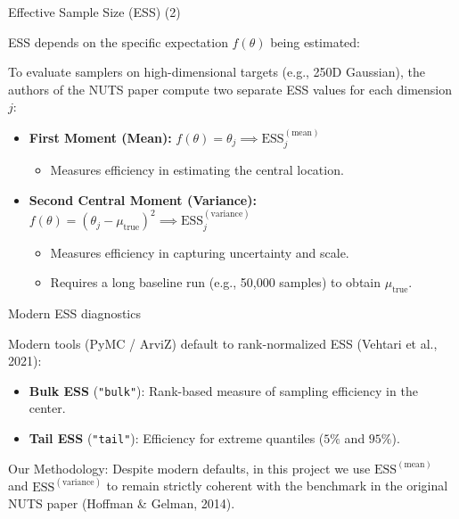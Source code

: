 \documentclass[aspectratio=43]{beamer}
\begin{document}
\begin{frame}{Effective Sample Size (ESS) (2)}
	
	ESS depends on the specific expectation \alert{$f(\theta)$} being estimated:
	
	\vspace{0.3em}
	
	To evaluate samplers on high-dimensional targets (e.g., 250D Gaussian), the authors of the NUTS paper compute two separate ESS values for each dimension $j$:
	
	\vspace{0.3em}
	
	\begin{itemize}
		\item \textbf{First Moment (Mean):} $f(\theta) = \theta_j \implies \text{ESS}_j^{(\text{mean})}$
		\begin{itemize}
			\item Measures efficiency in estimating the central location.
		\end{itemize}
		\vspace{0.2em}
		\item \textbf{Second Central Moment (Variance):} $f(\theta) = (\theta_j - \mu_{\text{true}})^2 \implies \text{ESS}_j^{(\text{variance})}$
		\begin{itemize}
			\item Measures efficiency in capturing uncertainty and scale.
			\item Requires a long baseline run (e.g., 50,000 samples) to obtain $\mu_{\text{true}}$.
		\end{itemize}
	\end{itemize}
	
\end{frame}



\begin{frame}{Modern ESS diagnostics}
	
	Modern tools (PyMC / ArviZ) default to rank-normalized ESS (Vehtari et al., 2021):
	\begin{itemize}
		\item \textbf{Bulk ESS} (\texttt{"bulk"}): Rank-based measure of sampling efficiency in the center.
		\item \textbf{Tail ESS} (\texttt{"tail"}): Efficiency for extreme quantiles ($5\%$ and $95\%$).
	\end{itemize}
	
	\vspace{0.8em}
	
	\alert{Our Methodology:} 
	Despite modern defaults, in this project we use \textbf{$\text{ESS}^{(\text{mean})}$} and \textbf{$\text{ESS}^{(\text{variance})}$} to remain strictly coherent with the benchmark in the original NUTS paper (Hoffman \& Gelman, 2014).
	
\end{frame}
\end{document}
